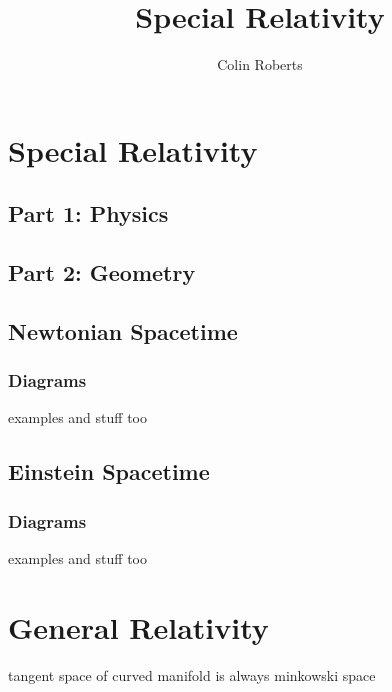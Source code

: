 \documentclass[12pt]{article}
\title{Special Relativity}
\author{Colin Roberts}
\theoremstyle{definition}
\begin{document}
\maketitle

\section{Special Relativity}

\subsection{Part 1: Physics}

\subsection{Part 2: Geometry}

\subsection{Newtonian Spacetime}
\subsubsection{Diagrams}
examples and stuff too


\subsection{Einstein Spacetime}
\subsubsection{Diagrams}
examples and stuff too

\section{General Relativity}
tangent space of curved manifold is always minkowski space
\end{document}
